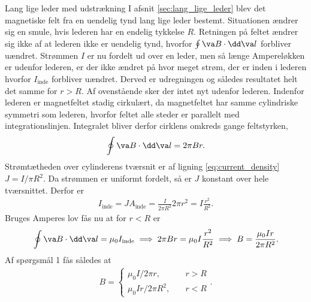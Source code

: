 \begin{opgave}{Lang lige leder med udstrækning}
    I afsnit \ref{sec:lang_lige_leder} blev det magnetiske felt fra en uendelig tynd lang lige leder bestemt. Situationen ændrer sig en smule, hvis lederen har en endelig tykkelse $R$.
    \opg Retningen på feltet ændrer sig ikke af at lederen ikke er uendelig tynd, hvorfor $\oint \va B \cdot \dd \va l$ forbliver uændret. Strømmen $I$ er nu fordelt ud over en leder, men så længe Ampereløkken er udenfor lederen, er der ikke ændret på hvor meget strøm, der er inden i lederen hvorfor $I_\mathrm{inde}$ forbliver uændret. Derved er udregningen og således resultatet helt det samme for $r>R$.
    \opg Af ovenstående sker der intet nyt udenfor lederen. Indenfor lederen er magnetfeltet stadig cirkulært, da magnetfeltet har samme cylindriske symmetri som lederen, hvorfor feltet alle steder er parallelt med integrationslinjen. Integralet bliver derfor cirklens omkreds gange feltstyrken,
    \begin{align}
        \oint \va B \cdot \dd \va l = 2\pi B r.
    \end{align}
    \opg Strømtætheden over cylinderens tværsnit er af ligning \eqref{eq:current_density} $J = I/\pi R^2$. Da strømmen er uniformt fordelt, så er $J$ konstant over hele tværsnittet. Derfor er
    \begin{align}
        I_\mathrm{inde} = JA_\mathrm{inde}= \frac{I}{2\pi R^2} 2\pi r^2 = I \frac{r^2}{R^2}.
    \end{align}
    \opg Bruges Amperes lov fås nu at for $r<R$ er
    \begin{align*}
        \oint \va B \cdot \dd \va l = \mu_0I_\mathrm{inde} \implies 2\pi B r = \mu_0I \frac{r^2}{R^2} \implies B = \frac{\mu_0Ir}{2\pi R^2}.
    \end{align*}
    Af spørgsmål 1 fås således at
    \begin{align*}
        B = \begin{cases}
            \mu_0I/2\pi r, \qquad &r>R \\
            \mu_0Ir/2\pi R^2, \quad &r<R
        \end{cases}
        .
    \end{align*}
    \begin{figure}
        \centering
        \begin{subfigure}[t]{.47\textwidth}
            \centering

\end{subfigure}
\end{figure}
\end{opgave}
